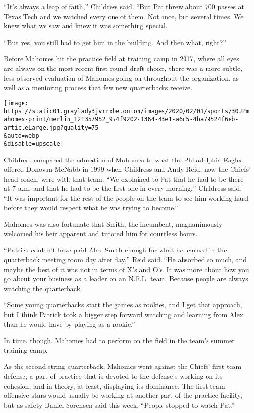 ``It's always a leap of faith,'' Childress said. ``But Pat threw about
700 passes at Texas Tech and we watched every one of them. Not once, but
several times. We knew what we saw and knew it was something special.

``But yes, you still had to get him in the building. And then what,
right?''

Before Mahomes hit the practice field at training camp in 2017, where
all eyes are always on the most recent first-round draft choice, there
was a more subtle, less observed evaluation of Mahomes going on
throughout the organization, as well as a mentoring process that few new
quarterbacks receive.

\texttt{[image: https://static01.graylady3jvrrxbe.onion/images/2020/02/01/sports/30JPmahomes-print/merlin\_121357952\_974f9202-1364-43e1-a6d5-4ba79524f6eb-articleLarge.jpg?quality=75\\\&auto=webp\\\&disable=upscale]}

Childress compared the education of Mahomes to what the Philadelphia
Eagles offered Donovan McNabb in 1999 when Childress and Andy Reid, now
the Chiefs' head coach, were with that team. ``We explained to Pat that
he had to be there at 7 a.m. and that he had to be the first one in
every morning,'' Childress said. ``It was important for the rest of the
people on the team to see him working hard before they would respect
what he was trying to become.''

Mahomes was also fortunate that Smith, the incumbent, magnanimously
welcomed his heir apparent and tutored him for countless hours.

``Patrick couldn't have paid Alex Smith enough for what he learned in
the quarterback meeting room day after day,'' Reid said. ``He absorbed
so much, and maybe the best of it was not in terms of X's and O's. It
was more about how you go about your business as a leader on an N.F.L.
team. Because people are always watching the quarterback.

``Some young quarterbacks start the games as rookies, and I get that
approach, but I think Patrick took a bigger step forward watching and
learning from Alex than he would have by playing as a rookie.''

In time, though, Mahomes had to perform on the field in the team's
summer training camp.

As the second-string quarterback, Mahomes went against the Chiefs'
first-team defense, a part of practice that is devoted to the defense's
working on its cohesion, and in theory, at least, displaying its
dominance. The first-team offensive stars would usually be working at
another part of the practice facility, but as safety Daniel Sorensen
said this week: ``People stopped to watch Pat.''

